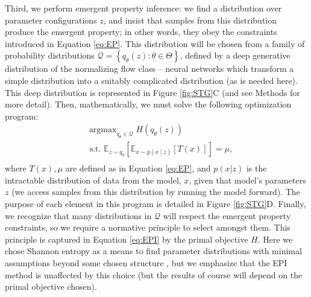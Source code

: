 \documentclass[11pt]{article}
\DeclareMathOperator*{\argmax}{argmax}
\begin{document}
Third, we perform emergent property inference: we find a distribution over parameter configurations $z$, and insist that samples from this distribution produce the emergent property; in other words, they obey the constraints introduced in Equation \ref{eq:EP}.  
This distribution will be chosen from a family of probability distributions $\mathcal{Q} = \left\{ q_\theta(z) : \theta \in \Theta \right\}$, defined by a deep generative distribution
of the normalizing flow class \cite{rezende2015variational, dinh2016density, papamakarios2017masked} -- neural networks which transform a simple distribution into a suitably complicated distribution (as is needed here).  
This deep distribution is represented in Figure \ref{fig:STG}C (and see Methods for more detail).  
Then, mathematically, we must solve the following optimization program: 
 \begin{equation} \label{eq:EPI}
\begin{split}
&\argmax_{q_\theta \in \mathcal{Q}} H(q_\theta(z)) \\
 &\text{  s.t.  } \mathbb{E}_{z \sim q_\theta}\left[ \mathbb{E}_{x\sim p(x \mid z)}\left[T(x)\right] \right] = \mu, \\
\end{split}
\end{equation}
where $T(x), \mu$ are defined as in Equation \ref{eq:EP}, and $p(x|z)$ is the intractable distribution of data from the model, $x$, given that model's parameters $z$ (we access samples from this distribution by running the model forward).   The purpose of each element in this program is detailed in Figure \ref{fig:STG}D.
Finally, we recognize that many distributions in $\mathcal{Q}$ will respect the emergent property constraints, so we require a normative principle to select amongst them.  
This principle is captured in Equation \ref{eq:EPI} by the primal objective $H$.  
Here we chose Shannon entropy as a means to find parameter distributions with minimal assumptions beyond some chosen structure \cite{jaynes1957information, elsayed2017structure, loaiza2017maximum, savin2017maximum}, but we emphasize that the EPI method is unaffected by this choice (but the results of course will depend on the primal objective chosen).  
\end{document}
